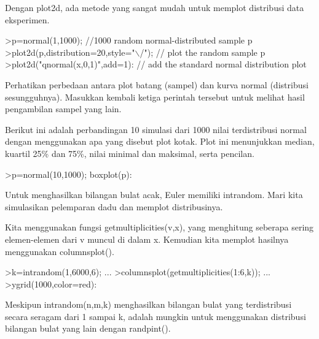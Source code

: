 \documentclass[12pt,arial,letterpaper]{book}
\begin{document}
\begin{eulernootebook}
\begin{eulercomment}
\begin{eulercomment}
\begin{eulernootebook}
\begin{eulercomment}
\begin{eulercomment}
\begin{eulercomment}
\begin{eulercomment}
\begin{eulercomment}
\begin{eulercomment}
\begin{eulercomment}
\begin{eulercomment}
Dengan plot2d, ada metode yang sangat mudah untuk memplot distribusi
data eksperimen.
\end{eulercomment}
\begin{eulerprompt}
>p=normal(1,1000); //1000 random normal-distributed sample p
>plot2d(p,distribution=20,style="\(\backslash\)/"); // plot the random sample p
>plot2d("qnormal(x,0,1)",add=1): // add the standard normal distribution plot
\end{eulerprompt}
\begin{eulercomment}
Perhatikan perbedaan antara plot batang (sampel) dan kurva normal
(distribusi sesungguhnya). Masukkan kembali ketiga perintah tersebut
untuk melihat hasil pengambilan sampel yang lain.
\end{eulercomment}
\begin{eulercomment}
Berikut ini adalah perbandingan 10 simulasi dari 1000 nilai
terdistribusi normal dengan menggunakan apa yang disebut plot kotak.
Plot ini menunjukkan median, kuartil 25\% dan 75\%, nilai minimal dan
maksimal, serta pencilan.
\end{eulercomment}
\begin{eulerprompt}
>p=normal(10,1000); boxplot(p):
\end{eulerprompt}
\begin{eulercomment}
Untuk menghasilkan bilangan bulat acak, Euler memiliki intrandom. Mari
kita simulasikan pelemparan dadu dan memplot distribusinya.

Kita menggunakan fungsi getmultiplicities(v,x), yang menghitung
seberapa sering elemen-elemen dari v muncul di dalam x. Kemudian kita
memplot hasilnya menggunakan columnsplot().
\end{eulercomment}
\begin{eulerprompt}
>k=intrandom(1,6000,6);  ...
>columnsplot(getmultiplicities(1:6,k));  ...
>ygrid(1000,color=red):
\end{eulerprompt}
\begin{eulercomment}
Meskipun intrandom(n,m,k) menghasilkan bilangan bulat yang
terdistribusi secara seragam dari 1 sampai k, adalah mungkin untuk
menggunakan distribusi bilangan bulat yang lain dengan randpint().


\end{eulercomment}
\end{eulercomment}
\end{eulercomment}
\end{eulercomment}
\end{eulercomment}
\end{eulercomment}
\end{eulercomment}
\end{eulercomment}
\end{eulernootebook}
\end{eulercomment}
\end{eulercomment}
\end{eulernootebook}
\end{document}
